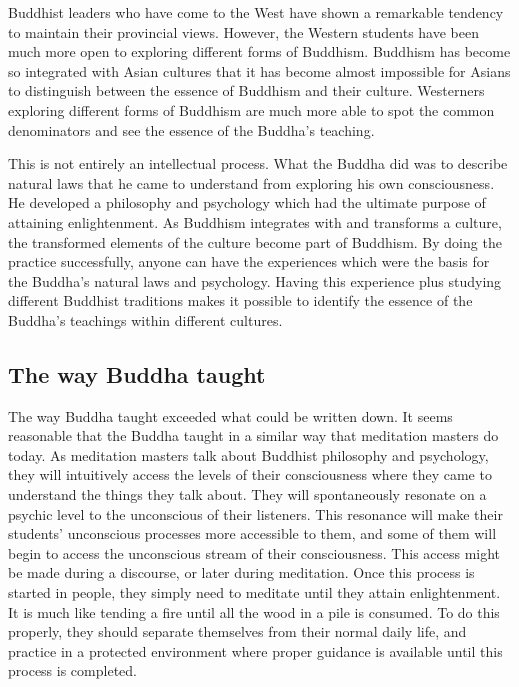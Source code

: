 \documentclass[a5paper,10pt,english]{book}
\begin{document}
\sphinxAtStartPar
Buddhist leaders who have come to the West have shown a remarkable
tendency to maintain their provincial views. However, the Western
students have been much more open to exploring different forms of
Buddhism. Buddhism has become so integrated with Asian cultures that it
has become almost impossible for Asians to distinguish between the
essence of Buddhism and their culture. Westerners exploring different
forms of Buddhism are much more able to spot the common denominators and
see the essence of the Buddha’s teaching.

\sphinxAtStartPar
This is not entirely an intellectual process. What the Buddha did was to
describe natural laws that he came to understand from exploring his own
consciousness. He developed a philosophy and psychology which had the
ultimate purpose of attaining enlightenment. As Buddhism integrates with
and transforms a culture, the transformed elements of the culture become
part of Buddhism. By doing the practice successfully, anyone can have
the experiences which were the basis for the Buddha’s natural laws and
psychology. Having this experience plus studying different Buddhist
traditions makes it possible to identify the essence of the Buddha’s
teachings within different cultures.


\subsection{The way Buddha taught}
\label{\detokenize{saints:the-way-buddha-taught}}
\sphinxAtStartPar
The way Buddha taught exceeded what could be written down. It seems
reasonable that the Buddha taught in a similar way that meditation
masters do today. As meditation masters talk about Buddhist philosophy
and psychology, they will intuitively access the levels of their
consciousness where they came to understand the things they talk about.
They will spontaneously resonate on a psychic level to the unconscious
of their listeners. This resonance will make their students’ unconscious
processes more accessible to them, and some of them will begin to access
the unconscious stream of their consciousness. This access might be made
during a discourse, or later during meditation. Once this process is
started in people, they simply need to meditate until they attain
enlightenment. It is much like tending a fire until all the wood in a
pile is consumed. To do this properly, they should separate themselves
from their normal daily life, and practice in a protected
environment where proper guidance is available until this process is
completed.
\end{document}
